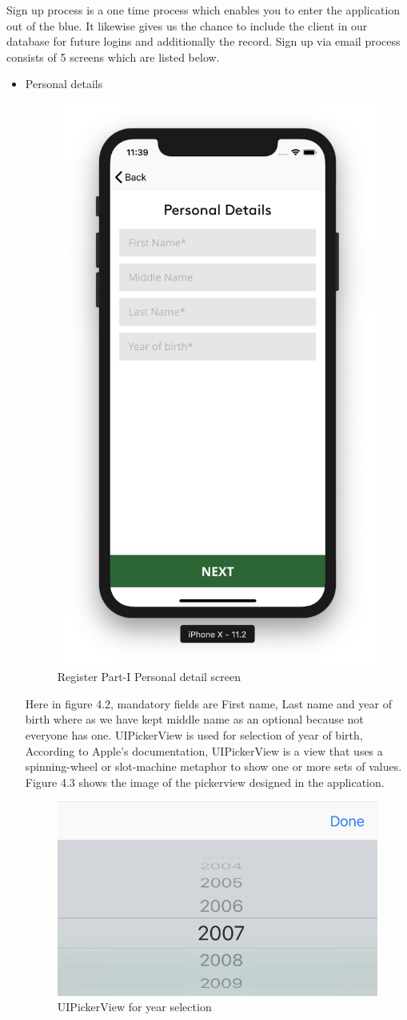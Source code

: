 Sign up process is a one time process which enables you to enter the application out of the blue. It likewise gives us the chance to include the client in our database for future logins and additionally the record. Sign up via email process consists of 5 screens which are listed below.

\begin{itemize}

    \item Personal details
    
    \begin{figure}[H]
            \centering
            \includegraphics[width=0.25\linewidth]{figures/ch4/register_personal.png}
            \caption{\label{fig:register_personal_ch4} Register Part-I Personal detail screen}
    \end{figure}
    
    Here in figure 4.2, mandatory fields are First name, Last name and year of birth where as we have kept middle name as an optional because not everyone has one. UIPickerView is used for selection of year of birth, According to Apple's documentation, UIPickerView is a view that uses a spinning-wheel or slot-machine metaphor to show one or more sets of values. Figure 4.3 shows the image of the pickerview designed in the application.
    
    \begin{figure}[H]
            \centering
            \includegraphics[width=0.25\linewidth]{figures/ch4/pickerview.png}
            \caption{\label{fig:pickerview} UIPickerView for year selection}
    \end{figure}
    
    \newpage


\end{itemize}
